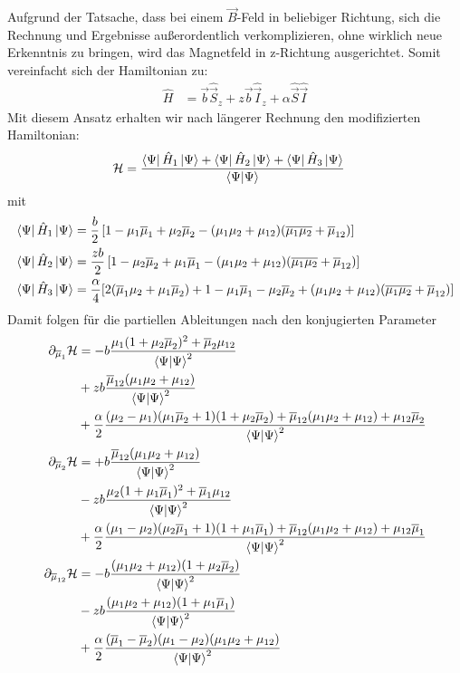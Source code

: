 Aufgrund der Tatsache, dass bei einem $\vec{B}$-Feld in beliebiger Richtung, sich die Rechnung und Ergebnisse außerordentlich verkomplizieren, ohne 
wirklich neue Erkenntnis zu bringen, wird das Magnetfeld in z-Richtung ausgerichtet. Somit vereinfacht sich der 
Hamiltonian zu:
\begin{align}
    \hat{H} &= \vec{b}\hat{\vec{S}}_z +  z\vec{b}\hat{\vec{I}}_z + \alpha \hat{\vec{S}}\hat{\vec{I}}
\end{align}
Mit diesem Ansatz erhalten wir nach längerer Rechnung den modifizierten Hamiltonian:
\begin{align}
    \mathcal{H} &= \frac{\bra{\Psi}\hat{H}_1\ket{\Psi} +\bra{\Psi}\hat{H}_2\ket{\Psi} + \bra{\Psi}\hat{H}_3\ket{\Psi}}{\bra{\Psi}\ket{\Psi}}
\end{align}
mit 
\begin{align}
    \bra{\Psi}\hat{H}_1\ket{\Psi} &=  \frac{b}{2}\left[ 1- \mu_1\overline{\mu}_1 + \mu_2\overline{\mu}_2 - (\mu_1 \mu_2 + \mu_{12})(\overline{\mu_1\mu_2} + \overline{\mu}_{12})\right]\\
    \bra{\Psi}\hat{H}_2\ket{\Psi} &=  \frac{z b}{2}\left[ 1- \mu_2\overline{\mu}_2 + \mu_1\overline{\mu}_1 - (\mu_1 \mu_2 + \mu_{12})(\overline{\mu_1\mu_2} + \overline{\mu}_{12})\right] \\
    \bra{\Psi}\hat{H}_3\ket{\Psi} &= \frac{\alpha}{4}[2(\overline{\mu}_1\mu_2 + \mu_1\overline{\mu}_2) + 1 - \mu_1\overline{\mu}_1 - \mu_2\overline{\mu}_2 + (\mu_1 \mu_2 + \mu_{12})(\overline{\mu_1\mu_2} + \overline{\mu}_{12})]
\end{align}
\noindent Damit folgen für die partiellen Ableitungen nach den konjugierten Parameter
\begin{align}
    \partial_{\overline{\mu}_1} \mathcal{H} &= 
    -b \frac{\mu_1(1+\mu_2\overline{\mu}_2)^2 + \overline{\mu}_2\mu_{12}}{\bra{\Psi}\ket{\Psi}^2}\nonumber\\
    &+z b \frac{\overline{\mu}_{12}(\mu_1\mu_2 + \mu_{12})}{\bra{\Psi}\ket{\Psi}^2}\nonumber\\
    &+\frac{\alpha}{2}\frac{(\mu_2-\mu_1)(\mu_1\overline{\mu}_2+1)(1+\mu_2\overline{\mu}_2)+\overline{\mu}_{12}(\mu_1\mu_2 + \mu_{12}) + \mu_{12}\overline{\mu}_2}{\bra{\Psi}\ket{\Psi}^2}\label{dH_Q1} \\
    \partial_{\overline{\mu}_2} \mathcal{H} &= 
    +b \frac{\overline{\mu}_{12}(\mu_1\mu_2 + \mu_{12})}{\bra{\Psi}\ket{\Psi}^2} \nonumber\\
    &-z b \frac{\mu_2(1+\mu_1\overline{\mu}_1)^2 + \overline{\mu}_1\mu_{12}}{\bra{\Psi}\ket{\Psi}^2} \nonumber\\
    &+\frac{\alpha}{2}\frac{(\mu_1-\mu_2)(\mu_2\overline{\mu}_1+1)(1+\mu_1\overline{\mu}_1)+\overline{\mu}_{12}(\mu_1\mu_2 + \mu_{12}) + \mu_{12}\overline{\mu}_1}{\bra{\Psi}\ket{\Psi}^2} \\
    \partial_{\overline{\mu}_{12}} \mathcal{H} &= 
    -b\frac{(\mu_1\mu_2+\mu_{12})(1+\mu_2\overline{\mu}_2)}{\bra{\Psi}\ket{\Psi}^2} \nonumber\\
    &-zb\frac{(\mu_1\mu_2+\mu_{12})(1+\mu_1\overline{\mu}_1)}{\bra{\Psi}\ket{\Psi}^2} \nonumber\\
    &+\frac{\alpha}{2}\frac{(\overline{\mu}_1-\overline{\mu}_2)(\mu_1-\mu_2)(\mu_1\mu_2+\mu_{12})}{\bra{\Psi}\ket{\Psi}^2}\label{dH_Q12}
\end{align}
